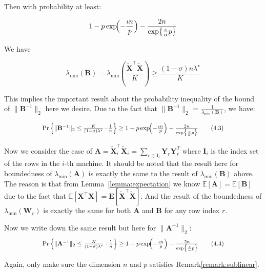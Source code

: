 \documentclass{beamer}
\theoremstyle{remark}
\begin{document}
\begin{frame}
Then with probability at least:

\[
1- p\exp\!\Bigl(-\frac{\iota n}{p}\Bigr) - \frac{2 n}{\exp\bigl\{\frac{c}{\alpha} p\bigr\}}
\]

We have 

\[
  \lambda_{\min}(\mathbf{B}) = \lambda_{\min}(\frac{\tilde{\mathbf{X}}^{\top}\tilde{\mathbf{X}}}{K})\ge\frac{(1-\sigma)n\lambda^{\star}}{K}
\]

This implies the important result about the probability inequality of the bound of \(\|\mathbf{B}^{-1}\|_2\) here we desire. Due to the fact that \(\|\mathbf{B}^{-1}\|_2\) = \(\frac{1}{\lambda_{\min}(\mathbf{B})}\), we have:

\[
\scalebox{0.87}{$
  \Pr\left\{\|\mathbf{B}^{-1}\|_2 \le\frac{K}{(1-\sigma)\lambda^{\star}}\cdot\frac{1}{n}\right\}\ge 1- p\exp\!\Bigl(-\frac{\iota n}{p}\Bigr) - \frac{2 n}{\exp\bigl\{\frac{c}{\alpha} p\bigr\}}\tag{4.3}\label{eq:4.3}
$}
\]
\end{frame}
\begin{frame}
Now we consider the case of $\mathbf{A} = \tilde{\mathbf{X}}_i^{\top}\tilde{\mathbf{X}}_i = \sum_{r\in \mathbf{I}_i} \mathbf{Y}_r\mathbf{Y}_r^T$ where $\mathbf{I}_i$ is the index set of the rows in the $i$-th machine.
It should be noted that the result here for boundedness of $\lambda_{\min}(\mathbf{A})$ is exactly the same to the result of $\lambda_{\min}(\mathbf{B})$ above. The reason is that from Lemma~\ref{lemma:expectation} we know $\mathbb{E}[\mathbf{A}] = \mathbb{E}[\mathbf{B}]$ due to the fact that $\mathbb{E}[\mathbf{X}^{\top}\mathbf{X}] = \mathbf{E}[\tilde{\mathbf{X}}^{\top}\tilde{\mathbf{X}}]$. And the result of the boundedness of $\lambda_{\min}(\mathbf{W}_r)$ is exactly the same for both $\mathbf{A}$ and $\mathbf{B}$ for any row index $r$.

Now we write down the same result but here for $\|\mathbf{A}^{-1}\|_2$:
\[
\scalebox{0.87}{$
  \Pr\left\{\|\mathbf{A}^{-1}\|_2 \le\frac{K}{(1-\sigma)\lambda^{\star}}\cdot\frac{1}{n}\right\}\ge 1- p\exp\!\Bigl(-\frac{\iota n}{p}\Bigr) - \frac{2 n}{\exp\bigl\{\frac{c}{\alpha} p\bigr\}}\tag{4.4}\label{eq:4.4}
$}
\]

Again, only make sure the dimension $n$ and $p$ satisfies Remark\ref{remark:sublinear}.
\end{frame}
\end{document}
